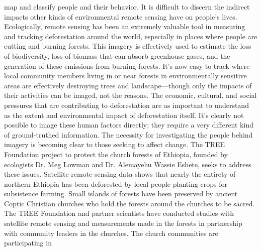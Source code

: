 \begin{itemize}
map and classify people and their behavior. It is difficult to discern the
indirect impacts other kinds of environmental remote sensing have on
people's lives. Ecologically, remote sensing has been an extremely valuable
tool in measuring and tracking deforestation around the world, especially
in places where people are cutting and burning forests. This imagery is
effectively used to estimate the loss of biodiversity, loss of biomass that
can absorb greenhouse gases, and the generation of these emissions from
burning forests. It's now easy to track where local community members
living in or near forests in environmentally sensitive areas are effectively
destroying trees and landscape—though only the impacts of their activities
can be imaged, not the reasons. The economic, cultural, and social pressures
that are contributing to deforestation are as important to understand
as the extent and environmental impact of deforestation itself. It's clearly
not possible to image these human factors directly; they require a very different
kind of ground-truthed information.
The necessity for investigating the people behind imagery is becoming clear
to those seeking to affect change. The TREE Foundation project to protect
the church forests of Ethiopia, founded by ecologists Dr. Meg Lowman and
Dr. Alemayehu Wassie Eshete, seeks to address these issues. Satellite remote
sensing data shows that nearly the entirety of northern Ethiopia has been
deforested by local people planting crops for subsistence farming. Small
islands of forests have been preserved by ancient Coptic Christian churches
who hold the forests around the churches to be sacred. The TREE Foundation
and partner scientists have conducted studies with satellite remote
sensing and measurements made in the forests in partnership with community
leaders in the churches. The church communities are participating in


\end{itemize}
